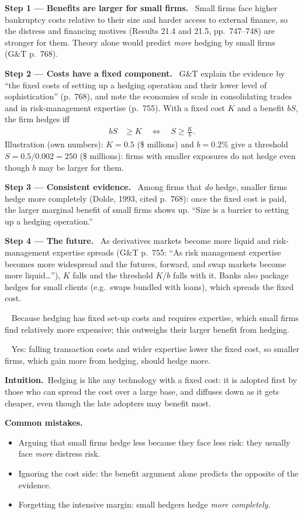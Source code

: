 \documentclass[11pt,a4paper]{article}
\newcommand{\step}[2]{\par\medskip\noindent\textbf{Step #1 --- #2.}~}
\newcommand{\intuition}{\par\medskip\noindent\textbf{Intuition.}~}
\newcommand{\answer}[1]{\par\smallskip\noindent\fbox{\textbf{Answer #1.}}~}
\newcommand{\pitfalls}{\par\medskip\noindent\textbf{Common mistakes.}}
\begin{document}
\step{1}{Benefits are larger for small firms} Small firms face higher bankruptcy costs relative to their size and harder access to external finance, so the distress and financing motives (Results 21.4 and 21.5, pp.~747--748) are stronger for them. Theory alone would predict \emph{more} hedging by small firms (G\&T p.~768).

\step{2}{Costs have a fixed component} G\&T explain the evidence by ``the fixed costs of setting up a hedging operation and their lower level of sophistication'' (p.~768), and note the economies of scale in consolidating trades and in risk-management expertise (p.~755). With a fixed cost $K$ and a benefit $bS$, the firm hedges iff
\begin{align}
  bS &\ge K \quad\Longleftrightarrow\quad S \ge \frac{K}{b}. \label{r6e3-thr}
\end{align}
Illustration (own numbers): $K=0.5$ (\$ millions) and $b=0.2\%$ give a threshold $S=0.5/0.002=250$ (\$ millions): firms with smaller exposures do not hedge even though $b$ may be larger for them.

\step{3}{Consistent evidence} Among firms that \emph{do} hedge, smaller firms hedge more completely (Dolde, 1993, cited p.~768): once the fixed cost is paid, the larger marginal benefit of small firms shows up. ``Size is a barrier to setting up a hedging operation.''

\step{4}{The future} As derivatives markets become more liquid and risk-management expertise spreads (G\&T p.~755: ``As risk management expertise becomes more widespread and the futures, forward, and swap markets become more liquid\ldots''), $K$ falls and the threshold $K/b$ falls with it. Banks also package hedges for small clients (e.g.\ swaps bundled with loans), which spreads the fixed cost.

\answer{(a)} Because hedging has fixed set-up costs and requires expertise, which small firms find relatively more expensive; this outweighs their larger benefit from hedging.
\answer{(b)} Yes: falling transaction costs and wider expertise lower the fixed cost, so smaller firms, which gain more from hedging, should hedge more.

\intuition Hedging is like any technology with a fixed cost: it is adopted first by those who can spread the cost over a large base, and diffuses down as it gets cheaper, even though the late adopters may benefit most.

\pitfalls
\begin{itemize}
  \item Arguing that small firms hedge less because they face less risk: they usually face \emph{more} distress risk.
  \item Ignoring the cost side: the benefit argument alone predicts the opposite of the evidence.
  \item Forgetting the intensive margin: small hedgers hedge \emph{more completely}.
\end{itemize}
\end{document}
